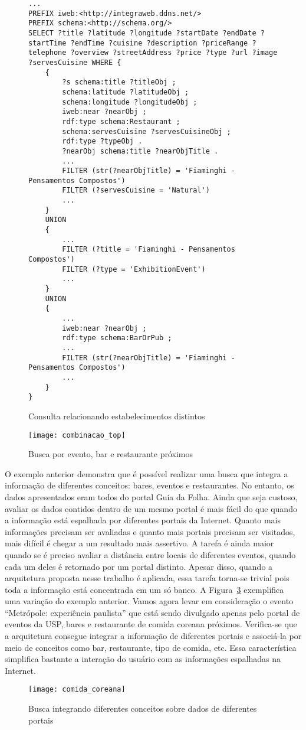 \begin{figure}[!ht]
    \begin{lstlisting}[language=SPARQL]
...
PREFIX iweb:<http://integraweb.ddns.net/>
PREFIX schema:<http://schema.org/>
SELECT ?title ?latitude ?longitude ?startDate ?endDate ?startTime ?endTime ?cuisine ?description ?priceRange ?telephone ?overview ?streetAddress ?price ?type ?url ?image ?servesCuisine WHERE {
	{
		?s schema:title ?titleObj ;
		schema:latitude ?latitudeObj ;
		schema:longitude ?longitudeObj ;
		iweb:near ?nearObj ; 
		rdf:type schema:Restaurant ;
		schema:servesCuisine ?servesCuisineObj ;
		rdf:type ?typeObj .
		?nearObj schema:title ?nearObjTitle .
		...
    	FILTER (str(?nearObjTitle) = 'Fiaminghi - Pensamentos Compostos')
		FILTER (?servesCuisine = 'Natural')
		...
	}
	UNION 
	{
		...
		FILTER (?title = 'Fiaminghi - Pensamentos Compostos')
		FILTER (?type = 'ExhibitionEvent')
		...
	}
	UNION 
	{
		...
		iweb:near ?nearObj ; 
		rdf:type schema:BarOrPub ;
		...
		FILTER (str(?nearObjTitle) = 'Fiaminghi - Pensamentos Compostos')
		...
	}
}
    \end{lstlisting}
    \caption{Consulta relacionando estabelecimentos distintos}
    \label{fig:sparql_consultas_compostas} 
\end{figure}

\begin{figure}[!ht]
  \centering
  \texttt{[image: combinacao\_top]} 
  \caption{Busca por evento, bar e restaurante próximos}
  \label{fig:combinacao_tres_eventos} 
\end{figure}


O exemplo anterior demonstra que é possível realizar uma busca que integra a informação de diferentes conceitos: bares, eventos e restaurantes. No entanto, os dados apresentados eram todos do portal Guia da Folha. Ainda que seja custoso, avaliar os dados contidos dentro de um mesmo portal é mais fácil do que quando a informação está espalhada por diferentes portais  da Internet. Quanto mais informações precisam ser avaliadas e quanto mais portais precisam ser visitados, mais difícil é chegar a um resultado mais assertivo. A tarefa é ainda maior quando se é preciso avaliar a distância entre locais de diferentes eventos, quando cada um deles é retornado por um portal distinto. Apesar disso, quando a arquitetura proposta nesse trabalho é aplicada, essa tarefa torna-se trivial pois toda a informação está concentrada em um só banco. A Figura~\ref{fig:comida_coreana} exemplifica uma variação do exemplo anterior. Vamos agora levar em consideração o evento ``Metrópole: experiência paulista'' que está sendo divulgado apenas pelo portal de eventos da USP, bares e restaurante de comida coreana próximos. Verifica-se que a arquitetura consegue integrar a informação de diferentes portais e associá-la por meio de conceitos como bar, restaurante, tipo de comida, etc. Essa característica simplifica bastante a interação do usuário com as informações espalhadas na Internet.

\begin{figure}[!ht]
  \centering
  \texttt{[image: comida\_coreana]} 
  \caption{Busca integrando diferentes conceitos sobre dados de diferentes portais}
  \label{fig:comida_coreana} 
\end{figure}


